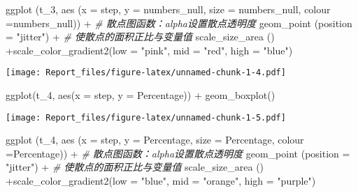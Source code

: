 \documentclass[
]{article}
\newenvironment{Shaded}{\begin{snugshade}}{\end{snugshade}}
\newcommand{\AttributeTok}[1]{\textcolor[rgb]{0.77,0.63,0.00}{#1}}
\newcommand{\CommentTok}[1]{\textcolor[rgb]{0.56,0.35,0.01}{\textit{#1}}}
\newcommand{\FunctionTok}[1]{\textcolor[rgb]{0.00,0.00,0.00}{#1}}
\newcommand{\NormalTok}[1]{#1}
\newcommand{\SpecialCharTok}[1]{\textcolor[rgb]{0.00,0.00,0.00}{#1}}
\newcommand{\StringTok}[1]{\textcolor[rgb]{0.31,0.60,0.02}{#1}}
\begin{document}
\begin{Shaded}
\begin{Highlighting}[]
\FunctionTok{ggplot}\NormalTok{ (t\_3, }\FunctionTok{aes}\NormalTok{ (}\AttributeTok{x =}\NormalTok{ step, }\AttributeTok{y =}\NormalTok{ numbers\_null, }\AttributeTok{size =}\NormalTok{ numbers\_null, }\AttributeTok{colour =}\NormalTok{numbers\_null)) }\SpecialCharTok{+}
  \CommentTok{\# 散点图函数：alpha设置散点透明度}
  \FunctionTok{geom\_point}\NormalTok{ (}\AttributeTok{position =} \StringTok{"jitter"}\NormalTok{) }\SpecialCharTok{+}
  \CommentTok{\# 使散点的面积正比与变量值}
  \FunctionTok{scale\_size\_area}\NormalTok{ () }\SpecialCharTok{+}\FunctionTok{scale\_color\_gradient2}\NormalTok{(}\AttributeTok{low =} \StringTok{"pink"}\NormalTok{, }\AttributeTok{mid =} \StringTok{"red"}\NormalTok{, }\AttributeTok{high =} \StringTok{"blue"}\NormalTok{)}
\end{Highlighting}
\end{Shaded}

\texttt{[image: Report\_files/figure-latex/unnamed-chunk-1-4.pdf]}

\begin{Shaded}
\begin{Highlighting}[]
\FunctionTok{ggplot}\NormalTok{(t\_4, }\FunctionTok{aes}\NormalTok{(}\AttributeTok{x =}\NormalTok{ step, }\AttributeTok{y =}\NormalTok{ Percentage)) }\SpecialCharTok{+} \FunctionTok{geom\_boxplot}\NormalTok{() }
\end{Highlighting}
\end{Shaded}

\texttt{[image: Report\_files/figure-latex/unnamed-chunk-1-5.pdf]}

\begin{Shaded}
\begin{Highlighting}[]
\FunctionTok{ggplot}\NormalTok{ (t\_4, }\FunctionTok{aes}\NormalTok{ (}\AttributeTok{x =}\NormalTok{ step, }\AttributeTok{y =}\NormalTok{ Percentage, }\AttributeTok{size =}\NormalTok{ Percentage, }\AttributeTok{colour =}\NormalTok{Percentage)) }\SpecialCharTok{+}
  \CommentTok{\# 散点图函数：alpha设置散点透明度}
  \FunctionTok{geom\_point}\NormalTok{ (}\AttributeTok{position =} \StringTok{"jitter"}\NormalTok{) }\SpecialCharTok{+}
  \CommentTok{\# 使散点的面积正比与变量值}
  \FunctionTok{scale\_size\_area}\NormalTok{ () }\SpecialCharTok{+}\FunctionTok{scale\_color\_gradient2}\NormalTok{(}\AttributeTok{low =} \StringTok{"blue"}\NormalTok{, }\AttributeTok{mid =} \StringTok{"orange"}\NormalTok{, }\AttributeTok{high =} \StringTok{"purple"}\NormalTok{)}
\end{Highlighting}
\end{Shaded}
\end{document}
